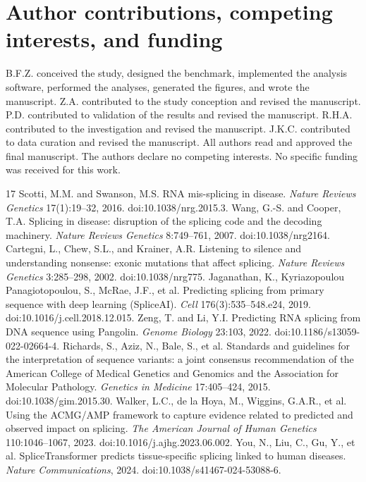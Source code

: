 \documentclass[11pt]{article}
\let\oldsection\section
\renewcommand{\section}{\Needspace*{7\baselineskip}\oldsection}
\begin{document}
\section{Author contributions, competing interests, and funding}
B.F.Z. conceived the study, designed the benchmark, implemented the analysis software,
performed the analyses, generated the figures, and wrote the manuscript. Z.A. contributed
to the study conception and revised the manuscript. P.D. contributed to validation of the
results and revised the manuscript. R.H.A. contributed to the investigation and revised the
manuscript. J.K.C. contributed to data curation and revised the manuscript. All authors read
and approved the final manuscript. The authors declare no competing interests. No specific
funding was received for this work.

\begin{thebibliography}{17}
 Scotti, M.M. and Swanson, M.S. RNA mis-splicing in disease. \emph{Nature Reviews Genetics} 17(1):19--32, 2016. doi:10.1038/nrg.2015.3.
 Wang, G.-S. and Cooper, T.A. Splicing in disease: disruption of the splicing code and the decoding machinery. \emph{Nature Reviews Genetics} 8:749--761, 2007. doi:10.1038/nrg2164.
 Cartegni, L., Chew, S.L., and Krainer, A.R. Listening to silence and understanding nonsense: exonic mutations that affect splicing. \emph{Nature Reviews Genetics} 3:285--298, 2002. doi:10.1038/nrg775.
 Jaganathan, K., Kyriazopoulou Panagiotopoulou, S., McRae, J.F., et al. Predicting splicing from primary sequence with deep learning (SpliceAI). \emph{Cell} 176(3):535--548.e24, 2019. doi:10.1016/j.cell.2018.12.015.
 Zeng, T. and Li, Y.I. Predicting RNA splicing from DNA sequence using Pangolin. \emph{Genome Biology} 23:103, 2022. doi:10.1186/s13059-022-02664-4.
 Richards, S., Aziz, N., Bale, S., et al. Standards and guidelines for the interpretation of sequence variants: a joint consensus recommendation of the American College of Medical Genetics and Genomics and the Association for Molecular Pathology. \emph{Genetics in Medicine} 17:405--424, 2015. doi:10.1038/gim.2015.30.
 Walker, L.C., de la Hoya, M., Wiggins, G.A.R., et al. Using the ACMG/AMP framework to capture evidence related to predicted and observed impact on splicing. \emph{The American Journal of Human Genetics} 110:1046--1067, 2023. doi:10.1016/j.ajhg.2023.06.002.
 You, N., Liu, C., Gu, Y., et al. SpliceTransformer predicts tissue-specific splicing linked to human diseases. \emph{Nature Communications}, 2024. doi:10.1038/s41467-024-53088-6.

\end{thebibliography}
\end{document}
